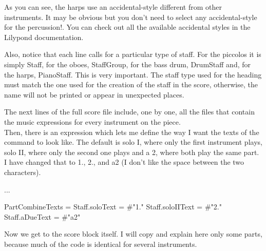 \documentclass[../../LilyPond-Tutorials]{subfiles}
\begin{document}
As you can see, the harps use an accidental-style different from other instruments.
It may be obvious but you don't need to select any accidental-style for the percussion!.
You can check out all the available accidental styles in the Lilypond documentation.

Also, notice that each line calls for a particular type of staff.
For the piccolos it is simply Staff, for the oboes, StaffGroup, for the bass drum, DrumStaff and, for the harps, PianoStaff.
This is very important.
The staff type used for the heading must match the one used for the creation of the staff in the score, otherwise, the name will not be printed or appear in unexpected places.

The next lines of the full score file include, one by one, all the files that contain the music expressions for every instrument on the piece.\\
Then, there is an expression which lets me define the way I want the texts of the  command to look like.
The default is solo I, where only the first instrument plays, solo II, where only the second one plays and a 2, where both play the same part.
I have changed that to 1., 2., and a2 (I don't like the space between the two characters).\\

\begin{lilypondcode}


...


PartCombineTexts = { %
       \set Staff.soloText = #"1."
       \set Staff.soloIIText = #"2."
       \set Staff.aDueText = #"a2"
}
\end{lilypondcode}

Now we get to the score block itself.
I will copy and explain here only some parts, because much of the code is identical for several instruments.
\end{document}
